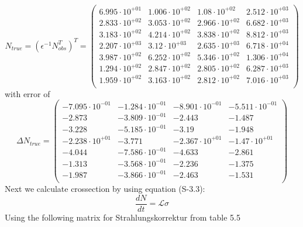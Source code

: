 \documentclass[]{article}
\begin{document}
\begin{equation}
N_{true} = (\epsilon^{-1}N_{obs}^T)^T = \begin{pmatrix}
   6.995\cdot 10^{+01} & 1.006\cdot 10^{+02} & 1.08\cdot 10^{+02} & 2.512\cdot 10^{+03} \\
   2.833\cdot 10^{+02} & 3.053\cdot 10^{+02} & 2.966\cdot 10^{+02} & 6.682\cdot 10^{+03} \\
   3.183\cdot 10^{+02} & 4.214\cdot 10^{+02} & 3.838\cdot 10^{+02} & 8.812\cdot 10^{+03} \\
   2.207\cdot 10^{+03} & 3.12\cdot 10^{+03} & 2.635\cdot 10^{+03} & 6.718\cdot 10^{+04} \\
   3.987\cdot 10^{+02} & 6.252\cdot 10^{+02} & 5.346\cdot 10^{+02} & 1.306\cdot 10^{+04} \\
   1.294\cdot 10^{+02} & 2.847\cdot 10^{+02} & 2.805\cdot 10^{+02} & 6.287\cdot 10^{+03} \\
   1.959\cdot 10^{+02} & 3.163\cdot 10^{+02} & 2.812\cdot 10^{+02} & 7.016\cdot 10^{+03} \\
\end{pmatrix}
\end{equation}
with error of 
\begin{equation}
\Delta N_{true} = \begin{pmatrix}
   -7.095\cdot 10^{-01} & -1.284\cdot 10^{-01} & -8.901\cdot 10^{-01} & -5.511\cdot 10^{-01} \\
   -2.873 & -3.809\cdot 10^{-01} & -2.443 & -1.487 \\
   -3.228 & -5.185\cdot 10^{-01} & -3.19 & -1.948 \\
   -2.238\cdot 10^{+01} & -3.771 & -2.367\cdot 10^{+01} & -1.47\cdot 10^{+01} \\
   -4.044 & -7.586\cdot 10^{-01} & -4.633 & -2.861 \\
   -1.313 & -3.568\cdot 10^{-01} & -2.236 & -1.375 \\
   -1.987 & -3.866\cdot 10^{-01} & -2.463 & -1.531 \\
\end{pmatrix}
\end{equation}
Next we calculate crossection by using equation (S-3.3):
\begin{equation}
\frac{dN}{dt} = \mathcal{L}\sigma
\label{eq:cs}
\end{equation}
Using the following matrix for Strahlungskorrektur from table 5.5
\end{document}
